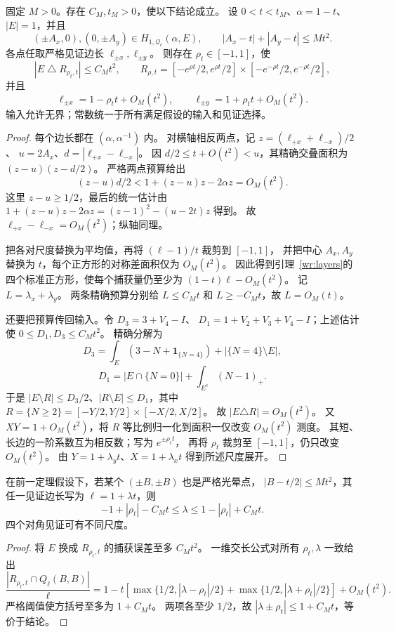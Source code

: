 \begin{theorem}[四轴见证迫使二阶近矩形]\label{wr:rigidity}
固定 $M>0$。存在 $C_M,t_M>0$，使以下结论成立。
设 $0<t<t_M$、$\alpha=1-t$、$|E|=1$，并且
\[
 (\pm A_x,0),(0,\pm A_y)\in H_{1,\mathcal Q_c}(\alpha,E),\qquad
 |A_x-t|+|A_y-t|\le Mt^2.
\]
各点任取严格见证边长 $\ell_{\pm x},\ell_{\pm y}$。
则存在 $\rho_t\in[-1,1]$，使
\[
 |E\mathbin\triangle R_{\rho_t,t}|\le C_Mt^2,\qquad
 R_{\rho,t}=[-e^{\rho t}/2,e^{\rho t}/2]\times[-e^{-\rho t}/2,e^{-\rho t}/2],
\]
并且
\[
 \ell_{\pm x}=1-\rho_t t+O_M(t^2),\qquad
 \ell_{\pm y}=1+\rho_t t+O_M(t^2).
\]
输入允许无界；常数统一于所有满足假设的输入和见证选择。
\end{theorem}
\begin{proof}
每个边长都在 $(\alpha,\alpha^{-1})$ 内。
对横轴相反两点，记 $z=(\ell_{+x}+\ell_{-x})/2$、
$u=2A_x$、$d=|\ell_{+x}-\ell_{-x}|$。
因 $d/2\le t+O(t^2)<u$，其精确交叠面积为 $(z-u)(z-d/2)$。
严格两点预算给出
\[
 (z-u)d/2<1+(z-u)z-2\alpha z=O_M(t^2).
\]
这里 $z-u\ge1/2$，最后的统一估计由
$1+(z-u)z-2\alpha z=(z-1)^2-(u-2t)z$ 得到。
故 $\ell_{+x}-\ell_{-x}=O_M(t^2)$；纵轴同理。

把各对尺度替换为平均值，再将 $(\ell-1)/t$ 裁剪到 $[-1,1]$，
并把中心 $A_x,A_y$ 替换为 $t$，每个正方形的对称差面积仅为 $O_M(t^2)$。
因此得到引理~\ref{wr:layers}的四个标准正方形，使每个捕获量仍至少为
$(1-t)\ell-O_M(t^2)$。
记 $L=\lambda_x+\lambda_y$。
两条精确预算分别给 $L\le C_Mt$ 和 $L\ge-C_Mt$，故 $L=O_M(t)$。

还要把预算传回输入。令 $D_3=3+V_4-I$、
$D_1=1+V_2+V_3+V_4-I$；上述估计使 $0\le D_1,D_3\le C_Mt^2$。
精确分解为
\[
 D_3=\int_E(3-N+\mathbf1_{\{N=4\}})+|\{N=4\}\setminus E|,
\]
\[
 D_1=|E\cap\{N=0\}|+\int_{E^c}(N-1)_+.
\]
于是 $|E\setminus R|\le D_3/2$、$|R\setminus E|\le D_1$，其中
$R=\{N\ge2\}=[-Y/2,Y/2]\times[-X/2,X/2]$。
故 $|E\triangle R|=O_M(t^2)$。
又 $XY=1+O_M(t^2)$，将 $R$ 等比例归一化到面积一仅改变 $O_M(t^2)$ 测度。
其短、长边的一阶系数互为相反数；写为 $e^{\pm\rho_t t}$，
再将 $\rho_t$ 裁剪至 $[-1,1]$，仍只改变 $O_M(t^2)$。
由 $Y=1+\lambda_y t$、$X=1+\lambda_x t$ 得到所述尺度展开。
\end{proof}

\begin{corollary}[对角尺度的必要窗口]\label{wr:diagonal-window}
在前一定理假设下，若某个 $(\pm B,\pm B)$ 也是严格光晕点，
$|B-t/2|\le Mt^2$，其任一见证边长写为 $\ell=1+\lambda t$，则
\[
 -1+|\rho_t|-C_Mt\le\lambda\le1-|\rho_t|+C_Mt.
\]
四个对角见证可有不同尺度。
\end{corollary}
\begin{proof}
将 $E$ 换成 $R_{\rho_t,t}$ 的捕获误差至多 $C_Mt^2$。
一维交长公式对所有 $\rho_t,\lambda$ 一致给出
\[
 \frac{|R_{\rho_t,t}\cap Q_\ell(B,B)|}{\ell}
 =1-t\left[\max\{1/2,|\lambda-\rho_t|/2\}
 +\max\{1/2,|\lambda+\rho_t|/2\}\right]+O_M(t^2).
\]
严格阈值使方括号至多为 $1+C_Mt$。
两项各至少 $1/2$，故 $|\lambda\pm\rho_t|\le1+C_Mt$，等价于结论。
\end{proof}

